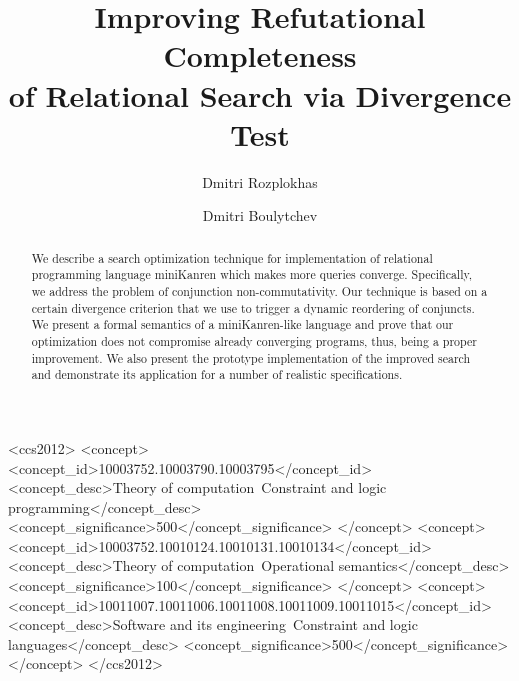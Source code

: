 \documentclass[sigconf]{acmart}
\begin{document}
\title[Improving Refutational Completeness of Relational Search]{Improving Refutational Completeness\\
of Relational Search via Divergence Test}


\author{Dmitri Rozplokhas}

\author{Dmitri Boulytchev}

\begin{abstract}
We describe a search optimization technique for implementation of relational programming language
miniKanren which makes more queries converge. Specifically, we address the problem of conjunction
non-commutativity. Our technique is based on a certain divergence criterion that we use to trigger a
dynamic reordering of conjuncts. We present a formal semantics of a miniKanren-like language and prove
that our optimization does not compromise already converging programs, thus, being a proper improvement.
We also present the prototype implementation of the improved search and demonstrate its application for a
number of realistic specifications.
\end{abstract}

%
%
\begin{CCSXML}
<ccs2012>
<concept>
<concept_id>10003752.10003790.10003795</concept_id>
<concept_desc>Theory of computation~Constraint and logic programming</concept_desc>
<concept_significance>500</concept_significance>
</concept>
<concept>
<concept_id>10003752.10010124.10010131.10010134</concept_id>
<concept_desc>Theory of computation~Operational semantics</concept_desc>
<concept_significance>100</concept_significance>
</concept>
<concept>
<concept_id>10011007.10011006.10011008.10011009.10011015</concept_id>
<concept_desc>Software and its engineering~Constraint and logic languages</concept_desc>
<concept_significance>500</concept_significance>
</concept>
</ccs2012>
\end{CCSXML}
\end{document}
